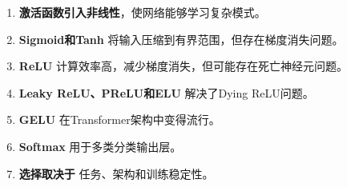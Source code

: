 \begin{enumerate}
    \item \textbf{激活函数引入非线性}，使网络能够学习复杂模式。
    
    \item \textbf{Sigmoid和Tanh} 将输入压缩到有界范围，但存在梯度消失问题。
    
    \item \textbf{ReLU} 计算效率高，减少梯度消失，但可能存在死亡神经元问题。
    
    \item \textbf{Leaky ReLU、PReLU和ELU} 解决了Dying ReLU问题。
    
    \item \textbf{GELU} 在Transformer架构中变得流行。
    
    \item \textbf{Softmax} 用于多类分类输出层。
    
    \item \textbf{选择取决于} 任务、架构和训练稳定性。
\end{enumerate}
